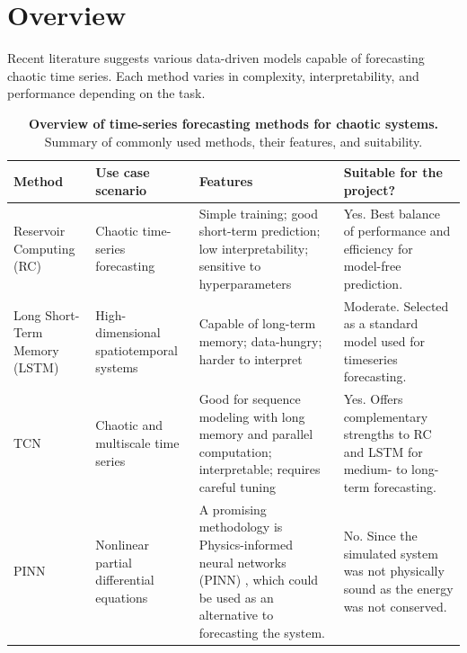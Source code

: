 \documentclass[%
 reprint,
 amsmath,amssymb,
 aps,
]{revtex4-2}
\begin{document}







\section{\label{sec:overview}Overview} %

Recent literature suggests various data-driven models capable of forecasting chaotic time series. Each method varies in complexity, interpretability, and performance depending on the task. 

\begin{table}
    \caption{\textbf{Overview of time-series forecasting methods for chaotic systems.} Summary of commonly used methods, their features, and suitability.}
    \label{tab:methodsoverview}
    \begin{tabular}{|p{2cm}|p{3cm}|p{6cm}|p{6cm}|}
    \hline
       \textbf{Method}  &  \textbf{Use case scenario}   &  \textbf{Features}  &  \textbf{Suitable for the project?}   \\
    \hline
        Reservoir Computing (RC)  & Chaotic time-series forecasting & Simple training; good short-term prediction; low interpretability; sensitive to hyperparameters \cite{pathak2018model, Pandey_PhysRevFluids.5.113506} & Yes. Best balance of performance and efficiency for model-free prediction.  \\
    \hline
        Long Short-Term Memory (LSTM) & High-dimensional spatiotemporal systems & Capable of long-term memory; data-hungry; harder to interpret \cite{vlachas2018data} & Moderate. Selected as a standard model used for timeseries forecasting.  \\
    \hline
        TCN & Chaotic and multiscale time series & Good for sequence modeling with long memory and parallel computation; interpretable; requires careful tuning \cite{bai2018empiricalevaluationgenericconvolutional} & Yes. Offers complementary strengths to RC and LSTM for medium- to long-term forecasting. \\
    \hline
        PINN & Nonlinear partial differential equations & A promising methodology is Physics-informed neural networks (PINN) \cite{RAISSI2019686}, which could be used as an alternative to forecasting the system. & No. Since the simulated system was not physically sound as the energy was not conserved. \\
    \hline
    \end{tabular}
\end{table}
\end{document}
